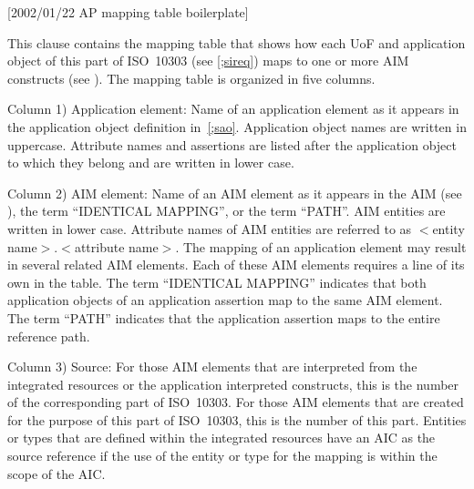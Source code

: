 [2002/01/22 AP mapping table boilerplate]

  This clause contains the mapping table that shows how each
UoF and application object of this part of ISO~10303
(see \cref{;sireq}) maps to one or more AIM constructs
(see ).
The mapping table is organized in five columns.

 Column 1) Application element: Name of an application
    element as it appears in the application object definition
    in~\ref{;sao}. Application object names are written in uppercase.
    Attribute names and assertions are listed after the application
    object to which they belong and are written in lower case.

 Column 2) AIM element: Name of an AIM element as it
    appears in the AIM (see ), the term ``IDENTICAL MAPPING'',
    or the term ``PATH''. AIM entities are written in lower case.
    Attribute names of AIM entities are referred to as
    $<$entity name$>$.$<$attribute name$>$. The mapping of an
    application element may result in several related AIM
    elements. Each of these AIM elements requires a line of its
    own in the table. The term ``IDENTICAL MAPPING'' indicates
    that both application objects of an application assertion
    map to the same AIM element. The term ``PATH'' indicates
    that the application assertion maps to the entire reference
    path.

 Column 3) Source: For those AIM elements that are
    interpreted from the integrated resources or the application
    interpreted constructs, this is the
    number of the corresponding part of ISO~10303. For those
    AIM elements that are created for the purpose of this part
    of ISO~10303, this is the number of this part.
    Entities or types that are defined within the integrated
    resources have an AIC as the source reference if the use
    of the entity or type for the mapping is within the scope
    of the AIC.

